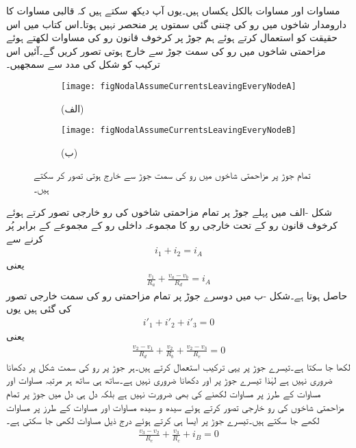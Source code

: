 مساوات  اور مساوات  بالکل یکساں ہیں۔یوں آپ دیکھ سکتے ہیں کہ قالبی مساوات کا دارومدار شاخوں میں رو کی چننی گئی سمتوں پر منحصر نہیں ہوتا۔اس کتاب میں اس حقیقت کو استعمال کرتے ہوئے ہم جوڑ پر کرخوف قانون رو کی مساوات لکھتے ہوئے مزاحمتی شاخوں میں رو کی سمت جوڑ سے خارج ہوتی تصور کریں گے۔آئیں اس ترکیب کو شکل  کی مدد سے سمجھیں۔
\begin{figure}
\centering
\begin{subfigure}{\textwidth}
\centering
\texttt{[image: figNodalAssumeCurrentsLeavingEveryNodeA]}
\caption*{(الف)}
\end{subfigure}
\begin{subfigure}{\textwidth}
\centering
\texttt{[image: figNodalAssumeCurrentsLeavingEveryNodeB]}
\caption*{(ب)}
\end{subfigure}
\caption{تمام جوڑ پر مزاحمتی شاخوں میں رو کی سمت جوڑ سے خارج ہوتی تصور کر سکتے ہیں۔}
\label{شکل_جوڑ_شاخوں_کی_رو_خارجی}
\end{figure}

شکل -الف میں پہلے جوڑ پر تمام مزاحمتی شاخوں کی رو خارجی تصور کرتے ہوئے کرخوف قانون رو کے تحت خارجی رو کا مجموعہ داخلی رو کے مجموعے کے برابر پُر کرنے سے
\begin{align}\label{مساوات_جوڑ_رو_خارجی_الف}
i_1+i_2=i_A
\end{align}
یعنی
\begin{align}\label{مساوات_جوڑ_رو_خارجی_ب}
\frac{v_1}{R_a}+\frac{v_a-v_b}{R_d}=i_A
\end{align}
حاصل ہوتا ہے۔شکل -ب میں دوسرے جوڑ پر تمام مزاحمتی رو کی سمت خارجی تصور کی گئی ہیں یوں
\begin{align}\label{مساوات_جوڑ_رو_خارجی_پ}
i'_1+i'_2+i'_3=0
\end{align}
یعنی
\begin{align}\label{مساوات_جوڑ_رو_خارجی_ت}
\frac{v_2-v_1}{R_d}+\frac{v_2}{R_b}+\frac{v_2-v_3}{R_e}=0
\end{align}
لکھا جا سکتا ہے۔تیسرے جوڑ پر یہی ترکیب استعمال کرتے ہیں۔ہر جوڑ پر رو کی سمت شکل پر دکھانا ضروری نہیں ہے لہٰذا تیسرے جوڑ پر  اور  دکھانا ضروری نہیں ہے۔ساتھ ہی ساتھ ہر مرتبہ مساوات  اور مساوات  کے طرز پر مساوات لکھنے کی بھی ضرورت نہیں ہے بلکہ دل ہی دل میں جوڑ پر تمام مزاحمتی شاخوں کی رو خارجی تصور کرتے ہوئے سیدھ و سیدھ  مساوات  اور مساوات  کے طرز پر مساوات لکھے جا سکتے ہیں۔تیسرے جوڑ پر ایسا ہی کرتے ہوئے درج ذیل مساوات لکھی جا سکتی ہے۔
\begin{align}\label{مساوات_جوڑ_رو_خارجی_ٹ}
\frac{v_3-v_2}{R_e}+\frac{v_3}{R_c}+i_B=0
\end{align}


